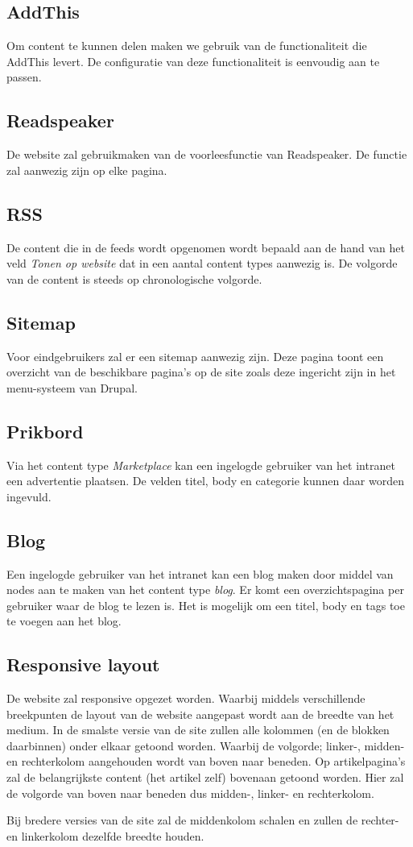 \subsection{AddThis}
Om content te kunnen delen maken we gebruik van de functionaliteit die AddThis levert. De configuratie van deze functionaliteit is eenvoudig aan te passen.

\subsection{Readspeaker}
De website zal gebruikmaken van de voorleesfunctie van Readspeaker. De functie zal aanwezig zijn op elke pagina.

\subsection{RSS}
De content die in de feeds wordt opgenomen wordt bepaald aan de hand van het veld \emph{Tonen op website} dat in een aantal content types aanwezig is. De volgorde van de content is steeds op chronologische volgorde.

\subsection{Sitemap}
Voor eindgebruikers zal er een sitemap aanwezig zijn. Deze pagina toont een overzicht van de beschikbare pagina's op de site zoals deze ingericht zijn in het menu-systeem van Drupal.

\subsection{Prikbord}
Via het content type \emph{Marketplace} kan een ingelogde gebruiker van het intranet een advertentie plaatsen. De velden titel, body en categorie kunnen daar worden ingevuld. 

\subsection{Blog}
Een ingelogde gebruiker van het intranet kan een blog maken door middel van nodes aan te maken van het content type \emph{blog}. Er komt een overzichtspagina per gebruiker waar de blog te lezen is. Het is mogelijk om een titel, body en tags toe te voegen aan het blog.

\subsection{Responsive layout}
De website zal responsive opgezet worden. Waarbij middels verschillende breekpunten de layout van de website aangepast wordt aan de breedte van het medium. In de smalste versie van de site zullen alle kolommen (en de blokken daarbinnen) onder elkaar getoond worden. Waarbij de volgorde; linker-, midden- en rechterkolom aangehouden wordt van boven naar beneden. Op artikelpagina's zal de belangrijkste content (het artikel zelf) bovenaan getoond worden. Hier zal de volgorde van boven naar beneden dus midden-, linker- en rechterkolom.

Bij bredere versies van de site zal de middenkolom schalen en zullen de rechter- en linkerkolom dezelfde breedte houden.